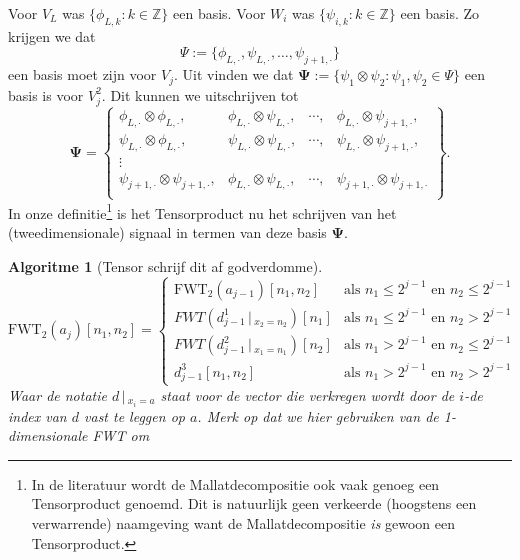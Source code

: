 \documentclass[11pt]{uvamath}
\newcommand{\Z}{\mathbb{Z}}
\theoremstyle{plain}
\newtheorem*{algo}{Algoritme}
\theoremstyle{definition}
\theoremstyle{remark}
\newcommand{\largediv}{\,\big|\,}
\begin{document}
Voor $V_L$ was $\{ \phi_{L,k}: k \in \Z \}$ een basis. Voor $W_i$ was $\{ \psi_{i,k}: k \in \Z \}$ een basis. Zo krijgen we dat
\[
	\Psi := \{ \phi_{L,\cdot}, \psi_{L,\cdot}, \ldots, \psi_{j+1,\cdot} \}
\]
een basis moet zijn voor $V_j$. Uit \cite[T8.5]{tensor_wavelet} vinden we dat $\boldsymbol\Psi := \{ \psi_1 \otimes \psi_2: \psi_1, \psi_2 \in \Psi \}$ een basis is voor $V_j^2$. Dit kunnen we uitschrijven tot
\[
  \boldsymbol\Psi = \left\{
  \begin{array}{cccc}
    \phi_{L, \cdot} \otimes \phi_{L, \cdot}, & \phi_{L, \cdot} \otimes \psi_{L, \cdot}, & \cdots, & \phi_{L, \cdot} \otimes \psi_{j+1,\cdot}, \\
    \psi_{L, \cdot} \otimes \phi_{L, \cdot}, & \psi_{L, \cdot} \otimes \psi_{L, \cdot}, & \cdots, & \psi_{L, \cdot} \otimes \psi_{j+1,\cdot} ,\\
    \vdots \\
    \psi_{j+1, \cdot} \otimes \psi_{j+1, \cdot}, & \phi_{L, \cdot} \otimes \psi_{L, \cdot}, & \cdots, & \psi_{j+1, \cdot} \otimes \psi_{j+1,\cdot} \\
  \end{array}\right\}.
\]
In onze definitie\footnote{In de literatuur wordt de Mallatdecompositie ook vaak genoeg een Tensorproduct genoemd. Dit is natuurlijk geen verkeerde (hoogstens een verwarrende) naamgeving want de Mallatdecompositie \emph{is} gewoon een Tensorproduct.} is het Tensorproduct nu het schrijven van het (tweedimensionale) signaal in termen van deze basis $\boldsymbol\Psi$. 

\begin{algo}[Tensor schrijf dit af godverdomme]
  \[
  \mathrm{FWT}_2(a_j)[n_1,n_2] = \begin{cases}
    \mathrm{FWT}_2(a_{j-1})[n_1,n_2] & \text{als } n_1 \leq 2^{j-1} \text{ en } n_2 \leq 2^{j-1}\\
    FWT(d^1_{j-1}\largediv_{x_2=n_2})[n_1]
    & \text{als } n_1\leq 2^{j-1} \text{ en } n_2>2^{j-1} \\
    FWT(d^2_{j-1}\largediv_{x_1=n_1})[n_2]
    & \text{als } n_1>2^{j-1} \text{ en } n_2\leq 2^{j-1} \\
    d^3_{j-1}[n_1,n_2] & \text{als } n_1>2^{j-1} \text{ en } n_2>2^{j-1} \end{cases}
  \]
  Waar de notatie $d\largediv_{x_i=a}$ staat voor de vector die verkregen wordt
  door de $i$-de index van $d$ vast te leggen op $a$.
  Merk op dat we hier gebruiken van de 1-dimensionale FWT om
\end{algo}
\end{document}
